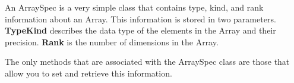 
An ArraySpec is a very simple class that contains type, kind, and
rank information about an Array.  This information is stored in two
parameters.  {\bf TypeKind} describes the data type of the elements
in the Array and their precision.  {\bf Rank} is the number of dimensions
in the Array.

The only methods that are associated with the ArraySpec class are those 
that allow you to set and retrieve this information.






